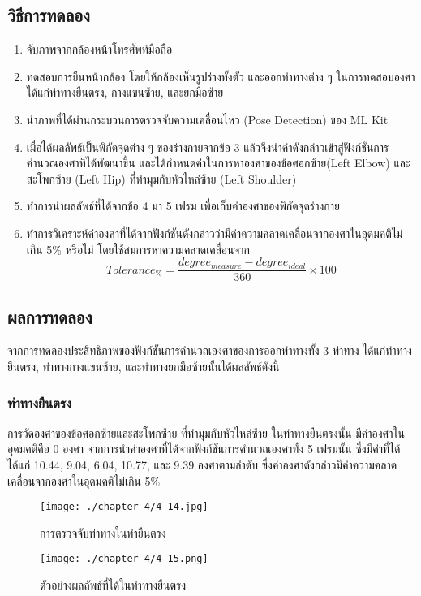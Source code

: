\subsection{วิธีการทดลอง}
\begin{enumerate}
	\item จับภาพจากกล้องหน้าโทรศัพท์มือถือ
	\item ทดสอบการยืนหน้ากล้อง โดยให้กล้องเห็นรูปร่างทั้งตัว และออกท่าทางต่าง ๆ ในการทดสอบองศา ได้แก่ท่าทางยืนตรง, กางแขนซ้าย, และยกมือซ้าย
	\item นำภาพที่ได้ผ่านกระบวนการตรวจจับความเคลื่อนไหว (Pose Detection) ของ ML Kit
	\item เมื่อได้ผลลัพธ์เป็นพิกัดจุดต่าง ๆ ของร่างกายจากข้อ 3 แล้วจึงนำค่าดังกล่าวเข้าสู่ฟังก์ชันการคำนวณองศาที่ได้พัฒนาขึ้น และได้กำหนดค่าในการหาองศาของข้อศอกซ้าย(Left Elbow) และสะโพกซ้าย (Left Hip) ที่ทำมุมกับหัวไหล่ซ้าย (Left Shoulder)
	\item ทำการนำผลลัพธ์ที่ได้จากข้อ 4 มา 5 เฟรม เพื่อเก็บค่าองศาของพิกัดจุดร่างกาย
	\item ทำการวิเคราะห์ค่าองศาที่ได้จากฟังก์ชันดังกล่าวว่ามีค่าความคลาดเคลื่อนจากองศาในอุดมคติไม่เกิน 5\% หรือไม่ โดยใช้สมการหาความคลาดเคลื่อนจาก
	      \begin{equation}
		      Tolerance_\%=\frac{degree_{measure} - degree_{ideal}}{360} \times 100
	      \end{equation}
\end{enumerate}
\subsection{ผลการทดลอง}
จากการทดลองประสิทธิภาพของฟังก์ชันการคำนวณองศาของการออกท่าทางทั้ง 3 ท่าทาง ได้แก่ท่าทางยืนตรง, ท่าทางกางแขนซ้าย, และท่าทางยกมือซ้ายนั้นได้ผลลัพธ์ดังนี้
\subsubsection{ท่าทางยืนตรง}
การวัดองศาของข้อศอกซ้ายและสะโพกซ้าย ที่ทำมุมกับหัวไหล่ซ้าย ในท่าทางยืนตรงนั้น มีค่าองศาในอุดมคติคือ 0 องศา จากการนำค่าองศาที่ได้จากฟังก์ชันการคำนวณองศาทั้ง 5 เฟรมนั้น ซึ่งมีค่าที่ได้ ได้แก่ 10.44, 9.04, 6.04, 10.77, และ 9.39 องศาตามลำดับ ซึ่งค่าองศาดังกล่าวมีค่าความคลาดเคลื่อนจากองศาในอุดมคติไม่เกิน 5\%
\begin{figure}
	\texttt{[image: ./chapter\_4/4-14.jpg]}
	\caption{การตรวจจับท่าทางในท่ายืนตรง}
\end{figure}
\begin{figure}
	\texttt{[image: ./chapter\_4/4-15.png]}
	\caption{ตัวอย่างผลลัพธ์ที่ได้ในท่าทางยืนตรง}
\end{figure}
